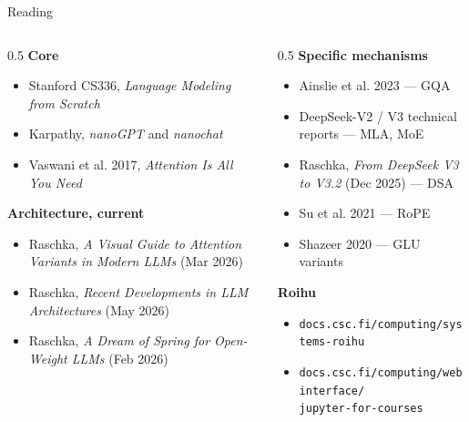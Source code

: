 \documentclass[aspectratio=169,10pt]{beamer}
\begin{document}
\begin{frame}{Reading}
  \begin{columns}[T]
    \begin{column}{0.5\textwidth}
      \textbf{Core}
      \begin{itemize}\small
        \item Stanford CS336, \textit{Language Modeling from Scratch}
        \item Karpathy, \textit{nanoGPT} and \textit{nanochat}
        \item Vaswani et al. 2017, \textit{Attention Is All You Need}
      \end{itemize}
      \vspace{0.5em}
      \textbf{Architecture, current}
      \begin{itemize}\small
        \item Raschka, \textit{A Visual Guide to Attention Variants in Modern LLMs} (Mar 2026)
        \item Raschka, \textit{Recent Developments in LLM Architectures} (May 2026)
        \item Raschka, \textit{A Dream of Spring for Open-Weight LLMs} (Feb 2026)
      \end{itemize}
    \end{column}
    \begin{column}{0.5\textwidth}
      \textbf{Specific mechanisms}
      \begin{itemize}\small
        \item Ainslie et al. 2023 --- GQA
        \item DeepSeek-V2 / V3 technical reports --- MLA, MoE
        \item Raschka, \textit{From DeepSeek V3 to V3.2} (Dec 2025) --- DSA
        \item Su et al. 2021 --- RoPE
        \item Shazeer 2020 --- GLU variants
      \end{itemize}
      \vspace{0.5em}
      \textbf{Roihu}
      \begin{itemize}\small
        \item \texttt{docs.csc.fi/computing/systems-roihu}
        \item \texttt{docs.csc.fi/computing/webinterface/}\\
              \texttt{jupyter-for-courses}
      \end{itemize}
    \end{column}
  \end{columns}
\end{frame}
\end{document}

